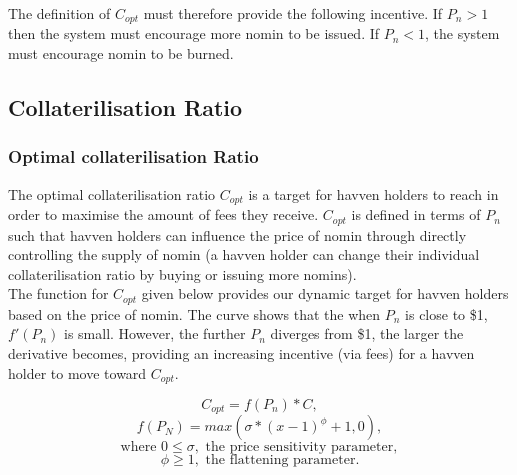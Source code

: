 \noindent The definition of $C_{opt}$ must therefore provide the following incentive. If $P_n > 1$ then the system must encourage more nomin to be issued. If $P_n < 1$, the system must encourage nomin to be burned. 

\newpage

\subsection{Collaterilisation Ratio}
\subsubsection{Optimal collaterilisation Ratio}


\noindent The optimal collaterilisation ratio $C_{opt}$ is a target for havven holders to reach in order to maximise the amount of fees they receive. $C_{opt}$ is defined in terms of $P_n$ such that havven holders can influence the price of nomin through directly controlling the supply of nomin (a havven holder can change their individual collaterilisation ratio by buying or issuing more nomins). \\
 
\noindent The function for $C_{opt}$ given below provides our dynamic target for havven holders based on the price of nomin. The curve shows that the when $P_n$ is close to \$1, $ f'(P_n) $ is small. However, the further $P_n$ diverges from \$1, the larger the derivative becomes, providing an increasing incentive (via fees) for a havven holder to move toward $C_{opt}$.

$$ C_{opt} = f(P_n) * C,$$
$$ f(P_N) = max(\sigma * (x - 1)^{\phi} + 1, 0), $$
$$\text{where } 0 \leq \sigma, \text{ the price sensitivity parameter}, $$
$$\phi \geq 1, \text{ the flattening parameter}. $$ \\

\begin{center}
\end{center}

